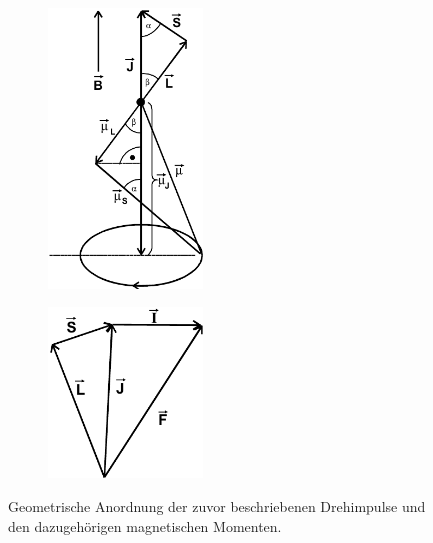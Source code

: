 \begin{figure}
\centering
\begin{subfigure}{.5\textwidth}
	\centering
	\includegraphics[width=0.45\textwidth]{img/Theorie1.png}
	\caption{}
	\label{fig:Theorie1}
\end{subfigure}%
\begin{subfigure}{.5\textwidth}
	\centering
	\includegraphics[width=0.45\textwidth]{img/Theorie2.png}
	\caption{}
	\label{fig:Theorie2}
\end{subfigure}
\caption{Geometrische Anordnung der zuvor beschriebenen Drehimpulse und den dazugehörigen magnetischen Momenten.}
\label{fig:geoAnordnung}
\end{figure}

